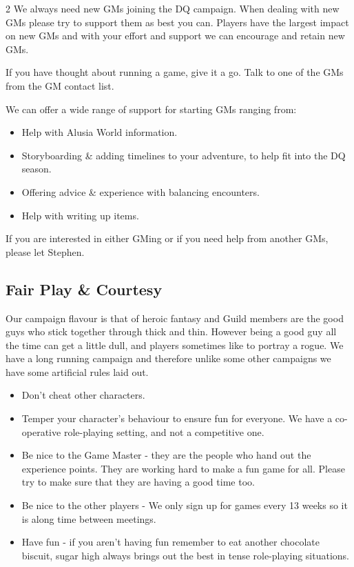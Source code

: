 \begin{multicols}{2}
We always need new GMs joining the DQ campaign. When dealing with new
GMs please try to support them as best you can.  Players have the
largest impact on new GMs and with your effort and support we can
encourage and retain new GMs.

If you have thought about running a game, give it a go. Talk to one of
the GMs from the GM contact list.

We can offer a wide range of support for starting GMs ranging from:

\begin{itemize}
\item Help with Alusia World information.
\item Storyboarding \& adding timelines to your adventure, to help fit
  into the DQ season.
\item Offering advice \& experience with balancing encounters.
\item Help with writing up items.
\end{itemize}

If you are interested in either GMing or if you need help from another
GMs, please let Stephen.

\subsection{Fair Play \& Courtesy}

Our campaign flavour is that of heroic fantasy and Guild members are
the good guys who stick together through thick and thin. However being
a good guy all the time can get a little dull, and players sometimes
like to portray a rogue. We have a long running campaign and therefore
unlike some other campaigns we have some artificial rules laid out.

\begin{itemize}
\item Don't cheat other characters.
\item Temper your character's behaviour to ensure fun for everyone. We
  have a co-operative role-playing setting, and not a competitive one.
\item Be nice to the Game Master - they are the people who hand out
  the experience points. They are working hard to make a fun game for
  all.  Please try to make sure that they are having a good time too.
\item Be nice to the other players - We only sign up for games every
  13 weeks so it is along time between meetings.
\item Have fun - if you aren’t having fun remember to eat another
  chocolate biscuit, sugar high always brings out the best in tense
  role-playing situations.
\end{itemize}


\end{multicols}
